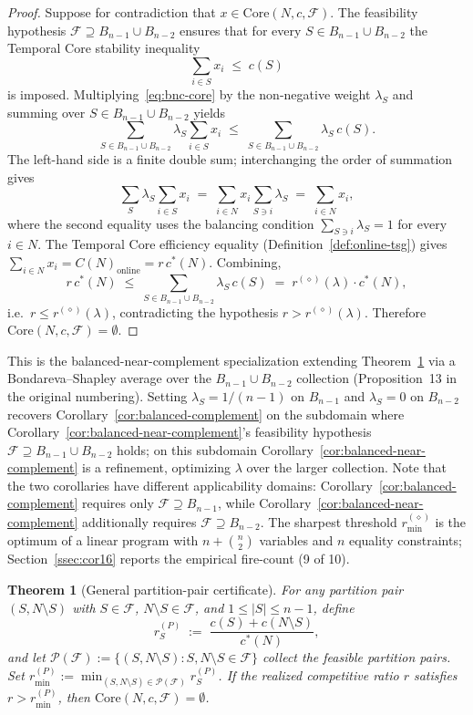\documentclass[11pt]{article}
\theoremstyle{plain}
\newtheorem{theorem}{Theorem}
\theoremstyle{definition}
\theoremstyle{remark}
\newcommand{\F}{\mathcal{F}}
\newcommand{\cstar}{c^{\ast}}
\begin{document}
\begin{proof}
Suppose for contradiction that $x\in\mathrm{Core}(N,c,\F)$. The feasibility hypothesis $\F\supseteq B_{n-1}\cup B_{n-2}$ ensures that for every $S\in B_{n-1}\cup B_{n-2}$ the Temporal Core stability inequality
\begin{equation}
\label{eq:bnc-core}
\sum_{i\in S}x_i \;\le\; c(S)
\end{equation}
is imposed. Multiplying~\eqref{eq:bnc-core} by the non-negative weight $\lambda_S$ and summing over $S\in B_{n-1}\cup B_{n-2}$ yields
\[
\sum_{S\in B_{n-1}\cup B_{n-2}}\lambda_S \sum_{i\in S} x_i \;\le\; \sum_{S\in B_{n-1}\cup B_{n-2}}\lambda_S\,c(S).
\]
The left-hand side is a finite double sum; interchanging the order of summation gives
\[
\sum_{S}\lambda_S \sum_{i\in S}x_i \;=\; \sum_{i\in N} x_i \sum_{S\ni i}\lambda_S \;=\; \sum_{i\in N} x_i,
\]
where the second equality uses the balancing condition $\sum_{S\ni i}\lambda_S=1$ for every $i\in N$. The Temporal Core efficiency equality (Definition~\ref{def:online-tsg}) gives $\sum_{i\in N} x_i = C(N)_{\text{online}} = r\,\cstar(N)$. Combining,
\[
r\,\cstar(N) \;\le\; \sum_{S\in B_{n-1}\cup B_{n-2}}\lambda_S\,c(S) \;=\; r^{(\diamond)}(\lambda)\cdot \cstar(N),
\]
i.e.\ $r\le r^{(\diamond)}(\lambda)$, contradicting the hypothesis $r>r^{(\diamond)}(\lambda)$. Therefore $\mathrm{Core}(N,c,\F)=\emptyset$.
\end{proof}

This is the balanced-near-complement specialization extending Theorem~\ref{thm:partition-pair} via a Bondareva--Shapley average over the $B_{n-1}\cup B_{n-2}$ collection (Proposition~13 in the original numbering). Setting $\lambda_S=1/(n-1)$ on $B_{n-1}$ and $\lambda_S=0$ on $B_{n-2}$ recovers Corollary~\ref{cor:balanced-complement} on the subdomain where Corollary~\ref{cor:balanced-near-complement}'s feasibility hypothesis $\F\supseteq B_{n-1}\cup B_{n-2}$ holds; on this subdomain Corollary~\ref{cor:balanced-near-complement} is a refinement, optimizing $\lambda$ over the larger collection. Note that the two corollaries have different applicability domains: Corollary~\ref{cor:balanced-complement} requires only $\F\supseteq B_{n-1}$, while Corollary~\ref{cor:balanced-near-complement} additionally requires $\F\supseteq B_{n-2}$. The sharpest threshold $r^{(\diamond)}_{\min}$ is the optimum of a linear program with $n+\binom{n}{2}$ variables and $n$ equality constraints; Section~\ref{ssec:cor16} reports the empirical fire-count (9 of 10).

\begin{theorem}[General partition-pair certificate]
\label{thm:partition-pair}
For any partition pair $(S,N\setminus S)$ with $S\in\F$, $N\setminus S\in\F$, and $1\le|S|\le n-1$, define
\[
r^{(P)}_{S} \;:=\; \frac{c(S)+c(N\setminus S)}{\cstar(N)},
\]
and let $\mathcal{P}(\F):=\{(S,N\setminus S):S,N\setminus S\in\F\}$ collect the feasible partition pairs. Set $r^{(P)}_{\min}:=\min_{(S,N\setminus S)\in\mathcal{P}(\F)} r^{(P)}_{S}$. If the realized competitive ratio $r$ satisfies $r>r^{(P)}_{\min}$, then $\mathrm{Core}(N,c,\F)=\emptyset$.
\end{theorem}
\end{document}
